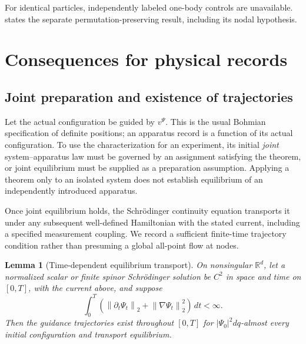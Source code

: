 \documentclass[11pt]{article}
\numberwithin{equation}{section}
\newtheorem{lemma}[lemma]{Lemma}
\theoremstyle{definition}
\newcommand{\R}{\mathbb R}
\newcommand{\norm}[1]{\left\|#1\right\|}
\begin{document}
For identical particles, independently labeled one-body controls are unavailable.  states the separate permutation-preserving result, including its nodal hypothesis.

\section{Consequences for physical records}\label{sec:measurement}

\subsection{Joint preparation and existence of trajectories}

Let the actual configuration be guided by \(v^\Psi\). This is the usual Bohmian specification of definite positions; an apparatus record is a function of its actual configuration. To use the characterization for an experiment, its initial \emph{joint} system--apparatus law must be governed by an assignment satisfying the theorem, or joint equilibrium must be supplied as a preparation assumption. Applying a theorem only to an isolated system does not establish equilibrium of an independently introduced apparatus.

Once joint equilibrium holds, the Schr\"odinger continuity equation transports it under any subsequent well-defined Hamiltonian with the stated current, including a specified measurement coupling. We record a sufficient finite-time trajectory condition rather than presuming a global all-point flow at nodes.

\begin{lemma}[Time-dependent equilibrium transport]\label{lem:flow}
On nonsingular \(\R^d\), let a normalized scalar or finite spinor Schr\"odinger solution be \(C^2\) in space and time on \([0,T]\), with the current above, and suppose
\begin{equation}\label{eq:flowbound}
 \int_0^T\left(\norm{\partial_t\Psi_t}_2+
                    \norm{\nabla\Psi_t}_2^2\right)\,dt<\infty.
\end{equation}
Then the guidance trajectories exist throughout \([0,T]\) for
\(|\Psi_0|^2dq\)-almost every initial configuration and transport equilibrium.
\end{lemma}
\end{document}
